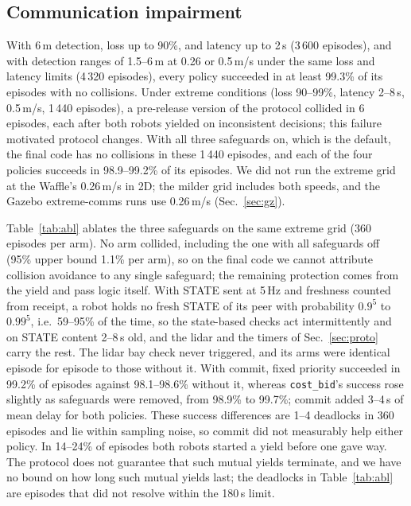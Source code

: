 \documentclass[letterpaper,journal]{IEEEtran}
\newcommand{\cb}{\texttt{cost\_bid}}
\begin{document}
\subsection{Communication impairment}\label{sec:comms}
With 6\,m detection, loss up to 90\%, and latency up to 2\,s (3\,600 episodes), and with detection ranges of 1.5--6\,m at 0.26 or 0.5\,m/s under the same loss and latency limits (4\,320 episodes), every policy succeeded in at least 99.3\% of its episodes with no collisions. Under extreme conditions (loss 90--99\%, latency 2--8\,s, 0.5\,m/s, 1\,440 episodes), a pre-release version of the protocol collided in 6 episodes, each after both robots yielded on inconsistent decisions; this failure motivated protocol changes. With all three safeguards on, which is the default, the final code has no collisions in these 1\,440 episodes, and each of the four policies succeeds in 98.9--99.2\% of its episodes. We did not run the extreme grid at the Waffle's 0.26\,m/s in 2D; the milder grid includes both speeds, and the Gazebo extreme-comms runs use 0.26\,m/s (Sec.~\ref{sec:gz}).

Table~\ref{tab:abl} ablates the three safeguards on the same extreme grid (360 episodes per arm). No arm collided, including the one with all safeguards off (95\% upper bound 1.1\% per arm), so on the final code we cannot attribute collision avoidance to any single safeguard; the remaining protection comes from the yield and pass logic itself. With STATE sent at 5\,Hz and freshness counted from receipt, a robot holds no fresh STATE of its peer with probability $0.9^5$ to $0.99^5$, i.e.\ 59--95\% of the time, so the state-based checks act intermittently and on STATE content 2--8\,s old, and the lidar and the timers of Sec.~\ref{sec:proto} carry the rest. The lidar bay check never triggered, and its arms were identical episode for episode to those without it. With commit, fixed priority succeeded in 99.2\% of episodes against 98.1--98.6\% without it, whereas \cb's success rose slightly as safeguards were removed, from 98.9\% to 99.7\%; commit added 3--4\,s of mean delay for both policies. These success differences are 1--4 deadlocks in 360 episodes and lie within sampling noise, so commit did not measurably help either policy. In 14--24\% of episodes both robots started a yield before one gave way. The protocol does not guarantee that such mutual yields terminate, and we have no bound on how long such mutual yields last; the deadlocks in Table~\ref{tab:abl} are episodes that did not resolve within the 180\,s limit.
\end{document}
